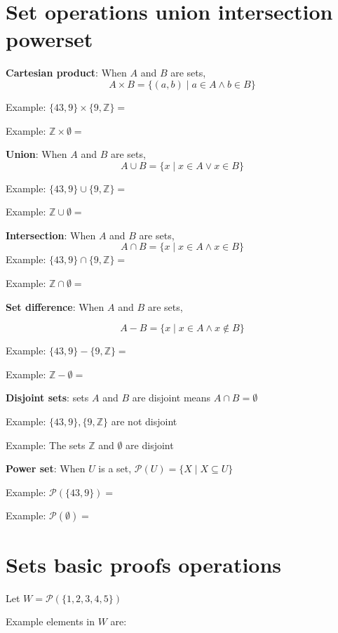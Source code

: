 \documentclass[12pt, oneside]{article}
\begin{document}
\section*{Set operations union intersection powerset}


{\bf Cartesian product}: When $A$ and  $B$ are sets, 
\[
    A \times  B = \{ (a,b) \mid a \in A  \wedge b  \in B \}
\]

Example: $\{43, 9\} \times  \{9, \mathbb{Z}\}  = $
    
Example: $\mathbb{Z} \times \emptyset  = $

{\bf Union}: When $A$ and  $B$ are sets,
\[
    A \cup  B = \{ x \mid x \in A  \vee x \in B \}
\]    
    
Example: $\{43, 9\} \cup \{9, \mathbb{Z}\}  = $

Example: $\mathbb{Z} \cup \emptyset  = $ 

{\bf Intersection}: When $A$ and  $B$ are sets,
\[
    A \cap  B = \{ x \mid x \in A  \wedge x \in B \}
\]    
Example: $\{43, 9\} \cap \{9,\mathbb{Z}\}  = $

Example: $\mathbb{Z} \cap \emptyset  = $


{\bf Set  difference}: When $A$ and  $B$ are sets,

\[
    A -  B = \{ x \mid x \in A  \wedge x \notin B \}
\]

Example: $\{43, 9\} - \{9, \mathbb{Z}\}  = $

Example: $\mathbb{Z} - \emptyset  = $

    
{\bf Disjoint sets}: sets $A$ and  $B$ are disjoint means $A \cap  B  = \emptyset$

Example: $\{43, 9\}, \{9, \mathbb{Z}\}$ are not  disjoint 

Example: The sets $\mathbb{Z}$ and $\emptyset$ are disjoint

    

{\bf Power set}: When $U$ is a set, $\mathcal{P}(U) = \{ X \mid X \subseteq U\}$

Example: $\mathcal{P}(\{43, 9\}) = $

Example: $\mathcal{P}(\emptyset) = $
 \vfill
\section*{Sets basic proofs operations}


Let $W =  \mathcal{P}(  \{ 1,2,3,4,5\} )$


Example elements in $W$ are:
\vspace{20pt}
\end{document}
